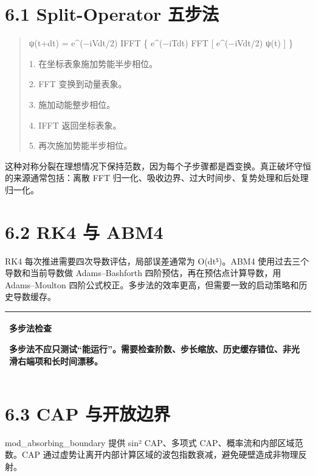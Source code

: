\documentclass[UTF8,openany,11pt,fontset=fandol]{ctexbook}
\begin{document}
\section{\texorpdfstring{\textbf{6.1 Split-Operator
五步法}}{6.1 Split-Operator 五步法}}\label{split-operator-ux4e94ux6b65ux6cd5}

\begin{quote}
ψ(t+dt) = e\^{}(−iVdt/2) IFFT \{ e\^{}(−iTdt) FFT {[} e\^{}(−iVdt/2)
ψ(t) {]} \}

1. 在坐标表象施加势能半步相位。

2. FFT 变换到动量表象。

3. 施加动能整步相位。

4. IFFT 返回坐标表象。

5. 再次施加势能半步相位。
\end{quote}

这种对称分裂在理想情况下保持范数，因为每个子步骤都是酉变换。真正破坏守恒的来源通常包括：离散
FFT 归一化、吸收边界、过大时间步、复势处理和后处理归一化。

\section{\texorpdfstring{\textbf{6.2 RK4 与
ABM4}}{6.2 RK4 与 ABM4}}\label{rk4-ux4e0e-abm4}

RK4 每次推进需要四次导数评估，局部误差通常为 O(dt⁵)。ABM4
使用过去三个导数和当前导数做 Adams--Bashforth
四阶预估，再在预估点计算导数，用 Adams--Moulton
四阶公式校正。多步法的效率更高，但需要一致的启动策略和历史导数缓存。

\begin{longtable}[]{@{}l@{}}
\toprule
\endhead
\begin{minipage}[t]{0.97\columnwidth}\raggedright
\textbf{多步法检查}

多步法不应只测试``能运行''。需要检查阶数、步长缩放、历史缓存错位、非光滑右端项和长时间漂移。\strut
\end{minipage}\tabularnewline
\bottomrule
\end{longtable}

\section{\texorpdfstring{\textbf{6.3 CAP
与开放边界}}{6.3 CAP 与开放边界}}\label{cap-ux4e0eux5f00ux653eux8fb9ux754c}

mod\_absorbing\_boundary 提供 sin² CAP、多项式
CAP、概率流和内部区域范数。CAP
通过虚势让离开内部计算区域的波包指数衰减，避免硬壁造成非物理反射。
\end{document}
